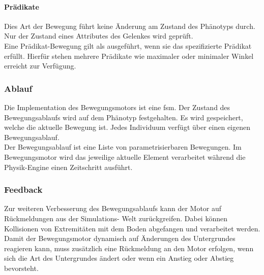         \paragraph{Prädikate\label{EngineMovementsPredicates}}

          Dies Art der Bewegung führt keine Änderung am Zustand des Phänotyps durch.
          Nur der Zustand eines Attributes des Gelenkes wird geprüft.
          \\
          Eine Prädikat-Bewegung gilt als ausgeführt, wenn sie das spezifizierte Prädikat erfüllt.
          Hierfür stehen mehrere Prädikate wie maximaler oder minimaler Winkel erreicht zur Verfügung.

      \subsubsection{Ablauf}

        Die Implementation des Bewegungsmotors ist eine \acrfull{fsm}.
        Der Zustand des Bewegungsablaufs wird auf dem Phänotyp festgehalten.
        Es wird gespeichert, welche die aktuelle Bewegung ist.
        Jedes Individuum verfügt über einen eigenen Bewegungsablauf.
        \\
        Der Bewegungsablauf ist eine Liste von parametrisierbaren Bewegungen.
        Im Bewegungsmotor wird das jeweilige aktuelle Element verarbeitet
        während die Physik-Engine einen Zeitschritt ausführt.

      \subsubsection{Feedback}

        Zur weiteren Verbesserung des Bewegungsablaufs kann der Motor auf Rückmeldungen aus der Simulations-
        Welt zurückgreifen.
        Dabei können Kollisionen von Extremitäten mit dem Boden abgefangen und verarbeitet werden.
        \\
        Damit der Bewegungsmotor dynamisch auf Änderungen des Untergrundes reagieren kann,
        muss zusätzlich eine Rückmeldung an den Motor erfolgen, wenn sich die Art des Untergrundes ändert
        oder wenn ein Anstieg oder Abstieg bevorsteht.
        \\


